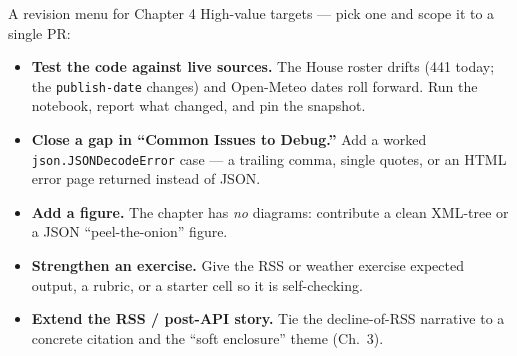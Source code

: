 \documentclass[9pt,aspectratio=169]{beamer}
\begin{document}
\begin{frame}{A revision menu for Chapter 4}
    High-value targets --- pick one and scope it to a single PR:
    \begin{itemize}
        \item \textbf{Test the code against live sources.} The House roster drifts (441 today; the \texttt{publish-date} changes) and Open-Meteo dates roll forward. Run the notebook, report what changed, and pin the snapshot.
        \item \textbf{Close a gap in ``Common Issues to Debug.''} Add a worked \texttt{json.JSONDecodeError} case --- a trailing comma, single quotes, or an HTML error page returned instead of JSON.
        \item \textbf{Add a figure.} The chapter has \textit{no} diagrams: contribute a clean XML-tree or a JSON ``peel-the-onion'' figure.
        \item \textbf{Strengthen an exercise.} Give the RSS or weather exercise expected output, a rubric, or a starter cell so it is self-checking.
        \item \textbf{Extend the RSS / post-API story.} Tie the decline-of-RSS narrative to a concrete citation and the ``soft enclosure'' theme (Ch.~3).
    \end{itemize}
\end{frame}
\end{document}
